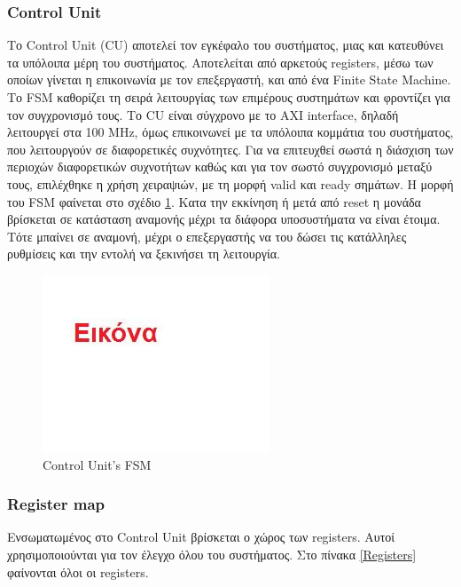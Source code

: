 \documentclass[12pt,a4paper]{book}
\begin{document}
\subsubsection{Control Unit}
Το Control Unit (CU) αποτελεί τον εγκέφαλο του συστήματος, μιας και κατευθύνει τα υπόλοιπα μέρη του συστήματος. Αποτελείται από αρκετούς registers, μέσω των οποίων γίνεται η επικοινωνία με τον επεξεργαστή, και από ένα Finite State Machine. Το FSM καθορίζει τη σειρά λειτουργίας των επιμέρους συστημάτων και φροντίζει για τον συγχρονισμό τους. 
Το CU είναι σύγχρονο με το AXI interface, δηλαδή λειτουργεί στα 100 MHz, όμως επικοινωνεί με τα υπόλοιπα κομμάτια του συστήματος, που λειτουργούν σε διαφορετικές συχνότητες. Για να επιτευχθεί σωστά η διάσχιση των περιοχών διαφορετικών συχνοτήτων καθώς και για τον σωστό συγχρονισμό μεταξύ τους, επιλέχθηκε η χρήση χειραψιών, με τη μορφή valid και ready σημάτων. 
Η μορφή του FSM φαίνεται στο σχέδιο \ref{CUFSM}. Κατα την εκκίνηση ή μετά από reset η μονάδα βρίσκεται σε κατάσταση αναμονής μέχρι τα διάφορα υποσυστήματα να είναι έτοιμα. Τότε μπαίνει σε αναμονή, μέχρι ο επεξεργαστής να του δώσει τις κατάλληλες ρυθμίσεις και την εντολή να ξεκινήσει τη λειτουργία.
\begin{figure}
	\centering
	\includegraphics[width=\textwidth]{myimage}
	\caption{Control Unit's FSM}
	\label{CUFSM}
\end{figure}

\subsubsection{Register map}
Ενσωματωμένος στο Control Unit βρίσκεται ο χώρος των registers. Αυτοί χρησιμοποιούνται για τον έλεγχο όλου του συστήματος. Στο πίνακα \ref{Registers} φαίνονται όλοι οι registers.
\end{document}
